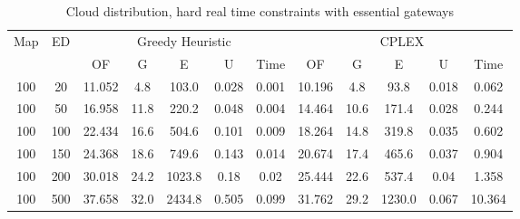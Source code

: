 \begin{table}[htb]
	\centering
	\begin{tabular}{|c|c|c|c|c|c|c|c|c|c|c|c|}
		\hline
		\multirow{2}{*}{Map} & \multirow{2}{*}{ED} & \multicolumn{5}{c|}{Greedy Heuristic} & \multicolumn{5}{c|}{CPLEX}\\ 
		\cline{3-12}
&& OF & G & E & U & Time & OF & G & E & U & Time\\ 
		\hline
		100 & 20 & 11.052 & 4.8 & 103.0 & 0.028 & 0.001 & 10.196 & 4.8 & 93.8 & 0.018 & 0.062 \\ 
		100 & 50 & 16.958 & 11.8 & 220.2 & 0.048 & 0.004 & 14.464 & 10.6 & 171.4 & 0.028 & 0.244 \\ 
		100 & 100 & 22.434 & 16.6 & 504.6 & 0.101 & 0.009 & 18.264 & 14.8 & 319.8 & 0.035 & 0.602 \\ 
		100 & 150 & 24.368 & 18.6 & 749.6 & 0.143 & 0.014 & 20.674 & 17.4 & 465.6 & 0.037 & 0.904 \\ 
		100 & 200 & 30.018 & 24.2 & 1023.8 & 0.18 & 0.02 & 25.444 & 22.6 & 537.4 & 0.04 & 1.358 \\ 
		100 & 500 & 37.658 & 32.0 & 2434.8 & 0.505 & 0.099 & 31.762 & 29.2 & 1230.0 & 0.067 & 10.364 \\ 
		\hline 
	\end{tabular} 
	\caption{Cloud distribution, hard real time constraints with essential gateways} 
	\label{tab:cloud_hard_esc} 
\end{table} 

